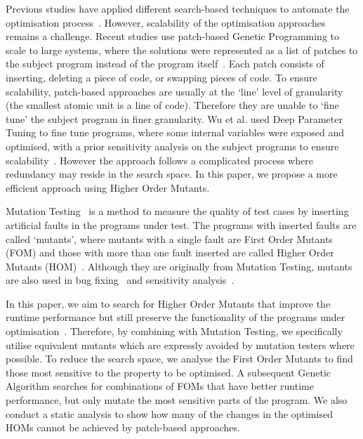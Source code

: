 \documentclass[oribibl]{llncs}
\begin{document}
Previous studies have applied different search-based techniques to automate the optimisation process~\cite{arcuri-ssbse-2011, 6035728,Brake:2008:ADS:1370018.1370031,hutter2009paramils}.
However, scalability of the optimisation approaches remains a challenge.
Recent studies use patch-based Genetic Programming to scale to large systems, where the solutions were represented as a list of patches to the subject program instead of the program itself~\cite{Bruce:2015:REC:2739480.2754752,geneticimprovementJP}.
Each patch consists of inserting, deleting a piece of code, or swapping pieces of code.
To ensure scalability, patch-based approaches are usually at the `line' level of granularity (the smallest atomic unit is a line of code). 
Therefore they are unable to `fine tune' the subject program in finer granularity. 
Wu et al. used Deep Parameter Tuning to fine tune programs, where some internal variables were exposed and optimised, with a prior sensitivity analysis on the subject programs to ensure scalability~\cite{Wu:2015:DPO:2739480.2754648}.
However the approach follows a complicated process where redundancy may reside in the search space.
In this paper, we propose a more efficient approach using Higher Order Mutants.

Mutation Testing~\cite{demillo1978hints,5487526} is a method to measure the quality of test cases by inserting artificial faults in the programs under test.
The programs with inserted faults are called `mutants', where mutants with a single fault are First Order Mutants (FOM) and those with more than one fault inserted are called Higher Order Mutants (HOM)~\cite{Harman:2011:SHO:2025113.2025144}.
Although they are originally from Mutation Testing, mutants are also used in bug fixing~\cite{6035728} and sensitivity analysis~\cite{Wu:2015:DPO:2739480.2754648}.

In this paper, we aim to search for Higher Order Mutants that improve the runtime performance but still preserve the functionality of the programs under optimisation~\cite{Jia:2015:GIU:2739482.2768417}.
Therefore, by combining with Mutation Testing, we specifically utilise equivalent mutants which are expressly avoided by mutation testers where possible.
To reduce the search space, we analyse the First Order Mutants to find those most sensitive to the property to be optimised.
A subsequent Genetic Algorithm searches for combinations of FOMs that have better runtime performance, but only mutate the most sensitive parts of the program.
We also conduct a static analysis to show how many of the changes in the optimised HOMs cannot be achieved by patch-based approaches.
\end{document}
